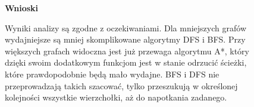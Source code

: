 \documentclass[a4paper,11pt]{report}
\begin{document}
\begin{figure}
  \begin{center}
  \textbf{Wnioski}
\\
\begin{flushleft}

Wyniki analizy są zgodne z oczekiwaniami. Dla mniejszych grafów wydajniejsze są mniej skomplikowane algorytmy DFS i BFS. Przy większych grafach widoczna jest już przewaga algorytmu A*, który dzięki swoim dodatkowym funkcjom jest w stanie odrzucić ścieżki, które prawdopodobnie będą mało wydajne. BFS i DFS nie przeprowadzają takich szacować, tylko przeszukują w określonej kolejności wszystkie wierzchołki, aż do napotkania zadanego.

\end{flushleft}
  \end{center}
\end{figure}
\end{document}
